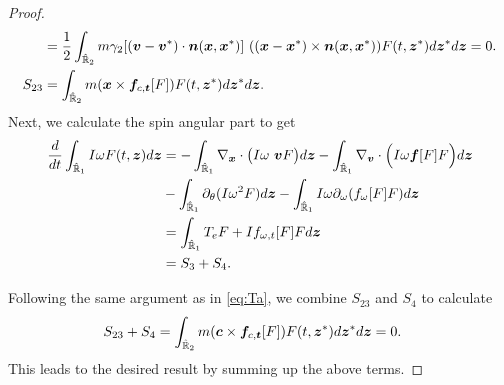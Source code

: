 \documentclass[10pt,a4paper]{amsart}
\def\d{{  \rm d}}
\newcommand{\bbr}{\mathbb R}
\newcommand{\bfc}{\boldsymbol{c}}
\newcommand{\bff}{\boldsymbol{f}}
\newcommand{\bfn}{\boldsymbol{n}}
\newcommand{\bft}{\boldsymbol{t}}
\newcommand{\bfv}{\boldsymbol{v}}
\newcommand{\bfx}{\boldsymbol{x}}
\newcommand{\bfz}{\boldsymbol{z}}
\begin{document}
\begin{proof}
\begin{align*}
&=  \frac12\int_{\hat{\bbr}_2}m\gamma_2 [ (\bfv  - \bfv^*) \cdot \bfn(\bfx, \bfx^*)]  \ ((\bfx-\bfx^*)\times \bfn(\bfx, \bfx^*))     F(t, \bfz^*)\d\bfz^*\d \bfz=0. \\
%
S_{23} 
&= \int_{\hat{\bbr}_2}  m(\bfx\times  \bff_{c, \bft}[F])F(t, \bfz^*) \d\bfz^*\d \bfz. 
\end{align*}
Next, we calculate the spin angular part to get
\begin{align*}
\frac{\d}{\d t} \int_{\hat{\bbr}_1}I \omega F(t,\bfz) \d \bfz 
&=- \int_{\hat{\bbr}_1}\nabla_{\bfx} \cdot \big (I \omega\ \bfv F \big)  \d\bfz
-  \int_{\hat{\bbr}_1}\nabla_{\bfv} \cdot  \Big ( I \omega\bff[F] F  \Big ) \d\bfz\\
&-\int_{\hat{\bbr}_1}\partial_\theta (I \omega^2 F) \d\bfz
- \int_{\hat{\bbr}_1} I \omega \partial_{\omega} ( f_{\omega}[F] F)\d\bfz\\
&=\int_{\hat{\bbr}_1} T_e F  + I f_{\omega,t}[F] F\d\bfz\\
&= S_3+S_4.
\end{align*}

%
Following the same argument as in \eqref{eq:Ta}, we combine $S_{23}$ and $S_4$ to calculate 
\begin{align*}
S_{23} + S_4 
&= \int_{\hat{\bbr}_2}  m(\bfc\times  \bff_{c, \bft}[F])F(t, \bfz^*) \d\bfz^*\d \bfz=0.
\end{align*}
This leads to the desired result by summing up the above terms.


\end{proof}
\end{document}
